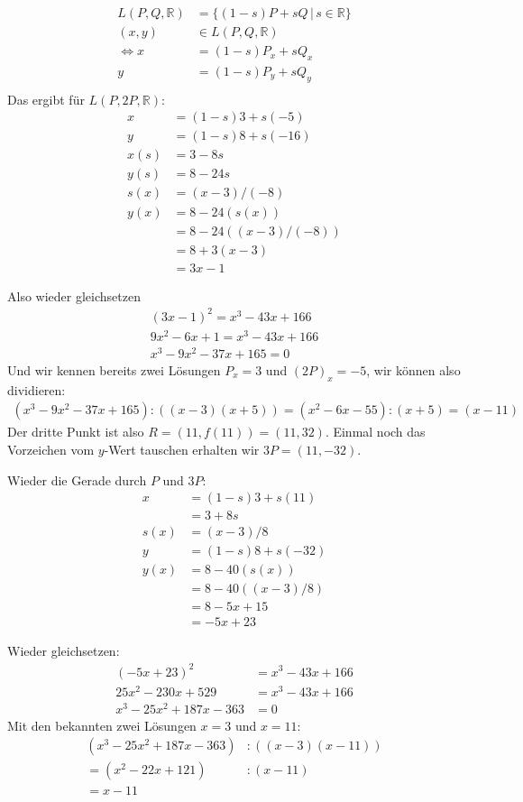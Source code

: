 \begin{enumerate}[label=\alph*)]
\begin{align*}
L(P,Q,\mathbb{R}) &= \{(1-s)P + sQ \,|\,s \in \mathbb{R}\} \\
(x,y) &\in L(P,Q,\mathbb{R}) \\
\Leftrightarrow x &= (1-s)P_{x} + sQ_{x} \\
y &= (1-s)P_{y} + sQ_{y} \\
\end{align*}
Das ergibt für $L(P, 2P, \mathbb{R})$:
\begin{align*}
x &= (1-s)3 + s(-5) \\
y &= (1-s)8 + s(-16) \\
x(s) &= 3 -8s \\
y(s) &= 8 - 24s \\
s(x) &= (x-3)/(-8) \\
y(x) &= 8 - 24(s(x)) \\
&= 8 - 24( (x-3)/(-8) ) \\
&= 8 + 3(x-3) \\
&= 3x - 1
\end{align*}

Also wieder gleichsetzen
\begin{align*}
(3x - 1)^{2} = x^{3} - 43x + 166 \\
9x^{2} - 6x + 1 = x^{3} - 43x + 166 \\
x^{3} - 9x^{2} - 37x +165 = 0
\end{align*}
Und wir kennen bereits zwei Lösungen $P_{x} = 3$ und $(2P)_{x} = -5$, wir können also dividieren:
\begin{align*}
(x^{3} - 9x^{2} - 37x + 165):((x-3)(x+5)) = (x^{2} - 6x - 55):(x+5) = (x-11)
\end{align*}
Der dritte Punkt ist also $R = (11, f(11)) = (11, 32)$. Einmal noch das Vorzeichen vom $y$-Wert tauschen erhalten wir $3P = (11, -32)$.

Wieder die Gerade durch $P$ und $3P$:
\begin{align*}
x &= (1-s)3 + s(11) \\
&= 3 + 8s \\
s(x) &= (x-3)/8 \\
y &= (1-s)8 + s(-32) \\
y(x) &= 8 - 40( s(x) ) \\
&= 8 - 40( (x-3)/8 ) \\
&= 8 - 5x + 15 \\
&= -5x + 23
\end{align*}

Wieder gleichsetzen:
\begin{align*}
(-5x + 23)^{2} &= x^{3} - 43x + 166 \\
25x^{2} - 230x + 529 &= x^{3} - 43x + 166 \\
x^{3} - 25x^{2} + 187x - 363 &= 0
\end{align*}
Mit den bekannten zwei Lösungen $x = 3$ und $x = 11$:
\begin{align*}
(x^{3} - 25x^{2} + 187x - 363)&:((x-3)(x-11)) \\
= (x^{2} - 22x + 121)&:(x-11) \\
= x-11
\end{align*}


\end{enumerate}
